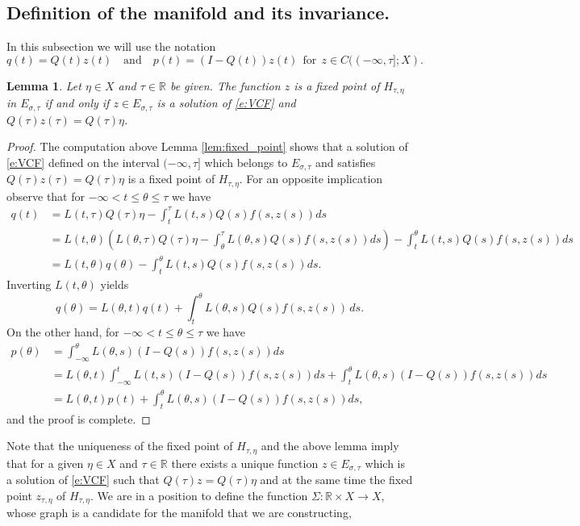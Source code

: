 \documentclass[a4paper,11pt,reqno]{amsart}
\theoremstyle{plain}
\newtheorem{lem}{Lemma}[section]
\theoremstyle{definition}
\numberwithin{equation}{section}
\newcommand{\R}{\mathbb{R}}
\renewcommand{\leq}{\leqslant}
\begin{document}
\subsection{Definition of the manifold and its invariance.} %
 In this subsection we will use the notation 
$$q(t)=Q(t)z(t)\quad\text{and}\quad p(t)=(I-Q(t))z(t)\ \ \text{for}\ \ z\in C((-\infty,\tau];X).$$
\begin{lem}\label{lem:lemma_solution}
    Let $\eta\in X$ and $\tau\in \R$ be given. The function $z$ is a fixed point of $H_{\tau,\eta}$ in $E_{\sigma,\tau}$ if and only if $z\in E_{\sigma,\tau}$ is a solution of \eqref{e:VCF} and $Q(\tau)z(\tau) = Q(\tau)\eta$. 
\end{lem}
\begin{proof}
    The computation above Lemma \ref{lem:fixed_point} shows that a solution of \eqref{e:VCF} defined on the interval $(-\infty,\tau]$ which belongs to $E_{\sigma,\tau}$ and satisfies $Q(\tau)z(\tau) = Q(\tau)\eta$ is a fixed point of $H_{\tau,\eta}$. For an opposite implication observe that for $-\infty<t\leq\theta\leq\tau$ we have 
\begin{equation*}%
\begin{split} 
q(t)&=L(t,\tau)Q(\tau)\eta-\int_{t}^{\tau}L(t,s)Q(s)f(s,z(s))ds\\
&=L(t,\theta)\left(L(\theta,\tau)Q(\tau)\eta-\int_{\theta}^{\tau}L(\theta,s)Q(s)f(s,z(s))ds\right)-\int_{t}^{\theta}L(t,s)Q(s)f(s,z(s))ds\\
& =L(t,\theta)q(\theta)-\int_{t}^{\theta}L(t,s)Q(s)f(s,z(s))ds.
\end{split}
\end{equation*}
Inverting $L(t,\theta)$ yields
$$
q(\theta) = L(\theta,t)q(t) + \int_t^\theta L(\theta,s)Q(s)f(s,z(s))\, ds.
$$
On the other hand, for $-\infty<t\leq \theta\leq\tau$ {we have}
\begin{equation*}%
\begin{split}
p(\theta)&=\int_{-\infty}^{\theta}L(\theta,s)(I-Q(s))f(s,z(s))ds\\
&=L(\theta,t)\int_{-\infty}^{t}L(t,s)(I-Q(s))f(s,z(s))ds+\int_{t}^{\theta}L(\theta,s)(I-Q(s))f(s,z(s))ds\\
&=L(\theta,t)p(t)+\int_{t}^{\theta}L(\theta,s)(I-Q(s))f(s,z(s))ds,
\end{split}
\end{equation*}
and the proof is complete. 
\end{proof}
Note that the uniqueness of the fixed point of $H_{\tau,\eta}$ and the above lemma imply that for a given $\eta\in X$ and $\tau\in \R$ there exists a unique function $z\in E_{\sigma,\tau}$ which is a solution of \eqref{e:VCF}  such that $Q(\tau)z=Q(\tau)\eta$ and at the same time the fixed point $z_{\tau,\eta}$ of $H_{\tau,\eta}$. We  are in a position to define the function $\Sigma\colon\R\times X\to X$, whose graph is a candidate for the manifold that we are constructing,
\end{document}
